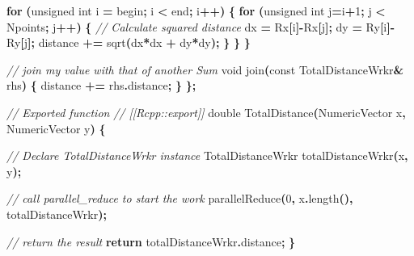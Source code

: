 \documentclass[
  12pt,
  american,
  a4paper,
  extrafontsizes,onecolumn,openright
  ]{memoir}
\newenvironment{Shaded}{\begin{snugshade}}{\end{snugshade}}
\newcommand{\AttributeTok}[1]{\textcolor[rgb]{0.77,0.63,0.00}{#1}}
\newcommand{\CommentTok}[1]{\textcolor[rgb]{0.56,0.35,0.01}{\textit{#1}}}
\newcommand{\ControlFlowTok}[1]{\textcolor[rgb]{0.13,0.29,0.53}{\textbf{#1}}}
\newcommand{\DataTypeTok}[1]{\textcolor[rgb]{0.13,0.29,0.53}{#1}}
\newcommand{\DecValTok}[1]{\textcolor[rgb]{0.00,0.00,0.81}{#1}}
\newcommand{\NormalTok}[1]{#1}
\newcommand{\OperatorTok}[1]{\textcolor[rgb]{0.81,0.36,0.00}{\textbf{#1}}}
\begin{document}
\begin{Shaded}
\begin{Highlighting}[]
    \ControlFlowTok{for} \OperatorTok{(}\DataTypeTok{unsigned} \DataTypeTok{int}\NormalTok{ i }\OperatorTok{=}\NormalTok{ begin}\OperatorTok{;}\NormalTok{ i }\OperatorTok{\textless{}}\NormalTok{ end}\OperatorTok{;}\NormalTok{ i}\OperatorTok{++)} \OperatorTok{\{}
      \ControlFlowTok{for} \OperatorTok{(}\DataTypeTok{unsigned} \DataTypeTok{int}\NormalTok{ j}\OperatorTok{=}\NormalTok{i}\OperatorTok{+}\DecValTok{1}\OperatorTok{;}\NormalTok{ j }\OperatorTok{\textless{}}\NormalTok{ Npoints}\OperatorTok{;}\NormalTok{ j}\OperatorTok{++)} \OperatorTok{\{}
          \CommentTok{// Calculate squared distance}
\NormalTok{          dx }\OperatorTok{=}\NormalTok{ Rx}\OperatorTok{[}\NormalTok{i}\OperatorTok{]{-}}\NormalTok{Rx}\OperatorTok{[}\NormalTok{j}\OperatorTok{];}
\NormalTok{          dy }\OperatorTok{=}\NormalTok{ Ry}\OperatorTok{[}\NormalTok{i}\OperatorTok{]{-}}\NormalTok{Ry}\OperatorTok{[}\NormalTok{j}\OperatorTok{];}
\NormalTok{          distance }\OperatorTok{+=}\NormalTok{ sqrt}\OperatorTok{(}\NormalTok{dx}\OperatorTok{*}\NormalTok{dx }\OperatorTok{+}\NormalTok{ dy}\OperatorTok{*}\NormalTok{dy}\OperatorTok{);}
      \OperatorTok{\}}
    \OperatorTok{\}}
  \OperatorTok{\}}

  \CommentTok{// join my value with that of another Sum}
  \DataTypeTok{void}\NormalTok{ join}\OperatorTok{(}\AttributeTok{const}\NormalTok{ TotalDistanceWrkr}\OperatorTok{\&}\NormalTok{ rhs}\OperatorTok{)} \OperatorTok{\{} 
\NormalTok{    distance }\OperatorTok{+=}\NormalTok{ rhs}\OperatorTok{.}\NormalTok{distance}\OperatorTok{;} 
  \OperatorTok{\}}
\OperatorTok{\};}


\CommentTok{// Exported function}
\CommentTok{// [[Rcpp::export]]}
\DataTypeTok{double}\NormalTok{ TotalDistance}\OperatorTok{(}\NormalTok{NumericVector x}\OperatorTok{,}\NormalTok{ NumericVector y}\OperatorTok{)} \OperatorTok{\{}
  
  \CommentTok{// Declare TotalDistanceWrkr instance}
\NormalTok{  TotalDistanceWrkr totalDistanceWrkr}\OperatorTok{(}\NormalTok{x}\OperatorTok{,}\NormalTok{ y}\OperatorTok{);}
  
  \CommentTok{// call parallel\_reduce to start the work}
\NormalTok{  parallelReduce}\OperatorTok{(}\DecValTok{0}\OperatorTok{,}\NormalTok{ x}\OperatorTok{.}\NormalTok{length}\OperatorTok{(),}\NormalTok{ totalDistanceWrkr}\OperatorTok{);}
  
  \CommentTok{// return the result}
  \ControlFlowTok{return}\NormalTok{ totalDistanceWrkr}\OperatorTok{.}\NormalTok{distance}\OperatorTok{;}
\OperatorTok{\}}
\end{Highlighting}
\end{Shaded}
\end{document}
